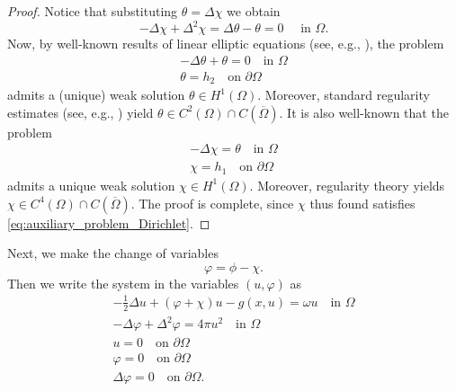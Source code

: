 \documentclass[reqno]{amsart}
\begin{document}
\begin{proof}
Notice that substituting $\theta = \Delta \chi$ we obtain
 \[
 - \Delta \chi + \Delta^2 \chi = \Delta \theta - \theta = 0 \quad \text{ in } \Omega.
 \]
Now, by well-known results of linear elliptic equations (see, e.g., \cite{Brezis2010}), 
the problem
\begin{gather*}
 - \Delta \theta + \theta  =  0  \quad \text{in } \Omega \\
 \theta  =  h_2  \quad \text{on } \partial\Omega
 \end{gather*}
admits a (unique) weak solution $\theta \in H^1(\Omega)$. 
Moreover, standard regularity estimates (see, e.g., \cite{GilbargTrudinger2001}) 
yield $\theta \in C^2(\Omega) \cap C(\overline \Omega)$.
It is also well-known that the problem
 \begin{gather*}
 - \Delta \chi  =  \theta  \quad \text{in } \Omega \\
 \chi  =  h_1 \quad \text{on } \partial\Omega
 \end{gather*}
admits a unique weak solution $\chi \in H^1(\Omega)$. Moreover, regularity theory 
yields $\chi \in C^4(\Omega) \cap C(\overline \Omega)$.
The proof is complete, since $\chi$ thus found satisfies 
\eqref{eq:auxiliary_problem_Dirichlet}.
\end{proof}

Next, we make the change of variables
\[
 \varphi = \phi - \chi.
\]
Then we write the system in the variables $(u, \varphi)$ as
\begin{equation}
 \label{eq:modified_system_Dirichlet}
\begin{gathered}
 - \frac{1}{2} \Delta u + (\varphi + \chi)u - g(x, u) 
 =  \omega u  \quad \text{in } \Omega \\
 - \Delta \varphi + \Delta^2 \varphi  =  4 \pi u^2  \quad \text{in } \Omega \\
 u  = 0 \quad \text{on } \partial\Omega \\
 \varphi  =  0  \quad \text{on } \partial\Omega \\
 \Delta \varphi  =  0  \quad \text{on } \partial\Omega.
 \end{gathered}
\end{equation}
\end{document}
